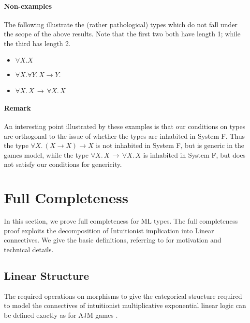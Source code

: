 \documentclass[a4paper,11pt]{article}
\begin{document}
\paragraph{Non-examples}
The following illustrate the (rather pathological) types which do not
fall under the scope of the above results. Note that the
first two both have length 1; while the third has length 2.
\begin{itemize}
\item $\forall X. X$
\item $\forall X.  \forall Y. \, X \rightarrow Y$.
\item $\forall X. \, X  \, \rightarrow \, \forall X. \, X$
\end{itemize}

\paragraph{Remark} An interesting point illustrated by these examples is that our
conditions on types are orthogonal to the issue of whether the types
are inhabited in System F. Thus the type $\forall X. \, (X \rightarrow
X) \rightarrow X$ is not inhabited in System F, but is generic in the
games model, while the type $\forall X. \, X  \, \rightarrow \,
\forall X. \, X$ is inhabited in System F, but does not satisfy our
conditions for genericity.




\section{Full Completeness}


In this section, we prove full completeness for ML types.  The
full completeness proof exploits the decomposition of Intuitionist
implication into Linear connectives.  We give the basic
definitions, referring to \cite{AJM00} for motivation and
technical details.



\subsection{Linear Structure} The required operations on
morphisms to give the categorical structure required to model the
connectives of intuitionist multiplicative exponential linear
logic can be defined exactly as for AJM games \cite{AJM00}.
\end{document}
